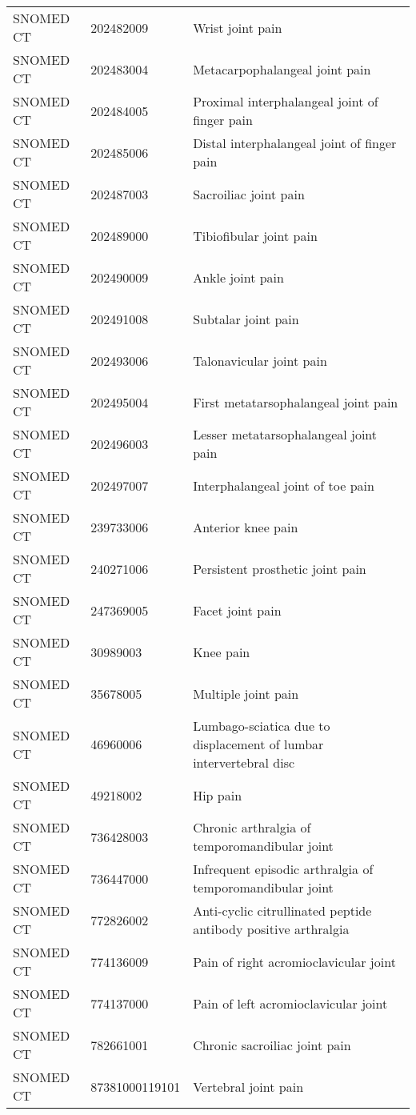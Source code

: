 \begin{longtable}{p{}p{}p{}}
  SNOMED CT & 202482009 & Wrist joint pain \\ 
  SNOMED CT & 202483004 & Metacarpophalangeal joint pain \\ 
  SNOMED CT & 202484005 & Proximal interphalangeal joint of finger pain \\ 
  SNOMED CT & 202485006 & Distal interphalangeal joint of finger pain \\ 
  SNOMED CT & 202487003 & Sacroiliac joint pain \\ 
  SNOMED CT & 202489000 & Tibiofibular joint pain \\ 
  SNOMED CT & 202490009 & Ankle joint pain \\ 
  SNOMED CT & 202491008 & Subtalar joint pain \\ 
  SNOMED CT & 202493006 & Talonavicular joint pain \\ 
  SNOMED CT & 202495004 & First metatarsophalangeal joint pain \\ 
  SNOMED CT & 202496003 & Lesser metatarsophalangeal joint pain \\ 
  SNOMED CT & 202497007 & Interphalangeal joint of toe pain \\ 
  SNOMED CT & 239733006 & Anterior knee pain \\ 
  SNOMED CT & 240271006 & Persistent prosthetic joint pain \\ 
  SNOMED CT & 247369005 & Facet joint pain \\ 
  SNOMED CT & 30989003 & Knee pain \\ 
  SNOMED CT & 35678005 & Multiple joint pain \\ 
  SNOMED CT & 46960006 & Lumbago-sciatica due to displacement of lumbar intervertebral disc \\ 
  SNOMED CT & 49218002 & Hip pain \\ 
  SNOMED CT & 736428003 & Chronic arthralgia of temporomandibular joint \\ 
  SNOMED CT & 736447000 & Infrequent episodic arthralgia of temporomandibular joint \\ 
  SNOMED CT & 772826002 & Anti-cyclic citrullinated peptide antibody positive arthralgia \\ 
  SNOMED CT & 774136009 & Pain of right acromioclavicular joint \\ 
  SNOMED CT & 774137000 & Pain of left acromioclavicular joint \\ 
  SNOMED CT & 782661001 & Chronic sacroiliac joint pain \\ 
  SNOMED CT & 87381000119101 & Vertebral joint pain \\ 

\end{longtable}
